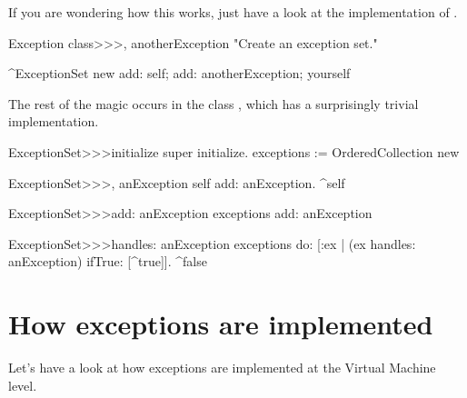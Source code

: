 \documentclass[a4paper,10pt,twoside]{book}
\begin{document}
If you are wondering how this works, just have a look at the implementation of .

\begin{code}{}
Exception class>>>, anotherException
	"Create an exception set."

	^ExceptionSet new
		add: self;
		add: anotherException;
		yourself
\end{code}

The rest of the magic occurs in the class , which has a surprisingly trivial implementation.

\begin{code}{}
ExceptionSet>>>initialize
	super initialize.
	exceptions := OrderedCollection new

ExceptionSet>>>, anException
	self add: anException.
	^self

ExceptionSet>>>add: anException
	exceptions add: anException

ExceptionSet>>>handles: anException
	exceptions do: [:ex | (ex handles: anException) ifTrue: [^true]].
	^false
\end{code}


\section{How exceptions are implemented}


Let's have a look at how exceptions are implemented at the Virtual Machine level.


\end{document}
